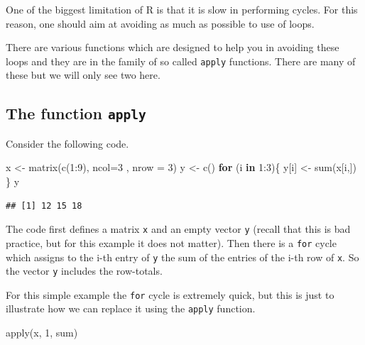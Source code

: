 \documentclass[
]{book}
\newenvironment{Shaded}{\begin{snugshade}}{\end{snugshade}}
\newcommand{\AttributeTok}[1]{\textcolor[rgb]{0.77,0.63,0.00}{#1}}
\newcommand{\ControlFlowTok}[1]{\textcolor[rgb]{0.13,0.29,0.53}{\textbf{#1}}}
\newcommand{\DecValTok}[1]{\textcolor[rgb]{0.00,0.00,0.81}{#1}}
\newcommand{\FunctionTok}[1]{\textcolor[rgb]{0.00,0.00,0.00}{#1}}
\newcommand{\NormalTok}[1]{#1}
\newcommand{\OtherTok}[1]{\textcolor[rgb]{0.56,0.35,0.01}{#1}}
\newcommand{\SpecialCharTok}[1]{\textcolor[rgb]{0.00,0.00,0.00}{#1}}
\begin{document}
One of the biggest limitation of R is that it is slow in performing cycles. For this reason, one should aim at avoiding as much as possible to use of loops.

There are various functions which are designed to help you in avoiding these loops and they are in the family of so called \texttt{apply} functions. There are many of these but we will only see two here.

\hypertarget{the-function-apply}{%
\subsection{\texorpdfstring{The function \texttt{apply}}{The function apply}}\label{the-function-apply}}

Consider the following code.

\begin{Shaded}
\begin{Highlighting}[]
\NormalTok{x }\OtherTok{\textless{}{-}} \FunctionTok{matrix}\NormalTok{(}\FunctionTok{c}\NormalTok{(}\DecValTok{1}\SpecialCharTok{:}\DecValTok{9}\NormalTok{), }\AttributeTok{ncol=}\DecValTok{3}\NormalTok{ , }\AttributeTok{nrow =} \DecValTok{3}\NormalTok{)}
\NormalTok{y }\OtherTok{\textless{}{-}} \FunctionTok{c}\NormalTok{()}
\ControlFlowTok{for}\NormalTok{ (i }\ControlFlowTok{in} \DecValTok{1}\SpecialCharTok{:}\DecValTok{3}\NormalTok{)\{}
\NormalTok{  y[i] }\OtherTok{\textless{}{-}} \FunctionTok{sum}\NormalTok{(x[i,])}
\NormalTok{\}}
\NormalTok{y}
\end{Highlighting}
\end{Shaded}

\begin{verbatim}
## [1] 12 15 18
\end{verbatim}

The code first defines a matrix \texttt{x} and an empty vector \texttt{y} (recall that this is bad practice, but for this example it does not matter). Then there is a \texttt{for} cycle which assigns to the i-th entry of \texttt{y} the sum of the entries of the i-th row of \texttt{x}. So the vector \texttt{y} includes the row-totals.

For this simple example the \texttt{for} cycle is extremely quick, but this is just to illustrate how we can replace it using the \texttt{apply} function.

\begin{Shaded}
\begin{Highlighting}[]
\FunctionTok{apply}\NormalTok{(x, }\DecValTok{1}\NormalTok{, sum)}
\end{Highlighting}
\end{Shaded}
\end{document}

